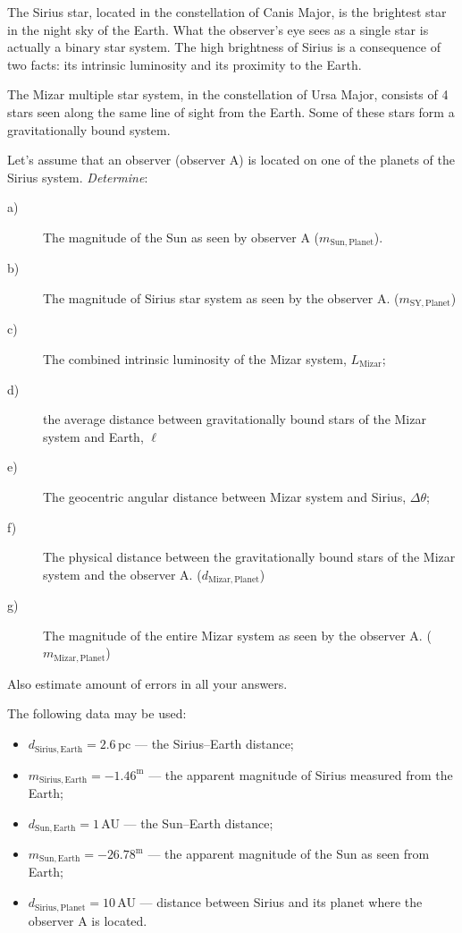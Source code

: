 The Sirius star, located in the constellation of Canis Major, is the brightest
star in the night sky of the Earth. What the observer's eye sees as a single
star is actually a binary star system. The high brightness of Sirius is a
consequence of two facts: its intrinsic luminosity and its proximity to the
Earth.

The Mizar multiple star system, in the constellation of Ursa Major, consists
of 4 stars seen along the same line of sight from the Earth. Some of these
stars form a gravitationally bound system.

Let's assume that an observer (observer A) is located on one of the planets of
the Sirius system. \emph{Determine}:

\begin{description}
\item[a)] The magnitude of the Sun as seen by observer A
  ($m_{\mathrm{Sun,Planet}}$).
\item[b)] The magnitude of Sirius star system as seen by the observer A.
  ($m_{\mathrm{SY,Planet}}$)
\item[c)] The combined intrinsic luminosity of the Mizar system,
  $L_{\mathrm{Mizar}}$;
\item[d)] the average distance between gravitationally bound stars of the
  Mizar system and Earth, $\ell$
\item[e)] The geocentric angular distance between Mizar system and Sirius,
  $\Delta\theta$;
\item[f)] The physical distance between the gravitationally bound stars of
  the Mizar system and the observer A. ($d_{\mathrm{Mizar,Planet}}$)
\item[g)] The magnitude of the entire Mizar system as seen by the observer A.
  ($m_{\mathrm{Mizar,Planet}}$)
\end{description}

Also estimate amount of errors in all your answers.

The following data may be used:
\begin{itemize}
\item $d_{\mathrm{Sirius,Earth}} = 2.6$\,pc --- the Sirius--Earth distance;
\item $m_{\mathrm{Sirius,Earth}} = -1.46^{\mathrm{m}}$ --- the apparent
  magnitude of Sirius measured from the Earth;
\item $d_{\mathrm{Sun,Earth}} = 1$\,AU --- the Sun--Earth distance;
\item $m_{\mathrm{Sun,Earth}} = -26.78^{\mathrm{m}}$ --- the apparent
  magnitude of the Sun as seen from Earth;
\item $d_{\mathrm{Sirius,Planet}} = 10$\,AU --- distance between Sirius and
  its planet where the observer A is located.
\end{itemize}

